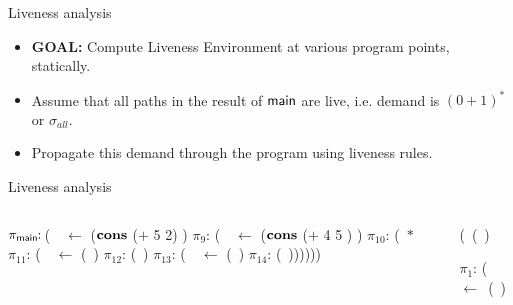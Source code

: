 \documentclass[xcolor=x11names,compress,mathserif]{beamer}
\renewcommand{\(}{\begin{columns}}
\renewcommand{\)}{\end{columns}}
\newcommand{\<}[1]{\begin{column}{#1}}
\renewcommand{\>}{\end{column}}
\begin{document}

\begin{frame}{Liveness analysis}
  \begin{itemize}
  \item {\bf  GOAL:} Compute  Liveness Environment at  various program
    points, statically. 
  \item Assume that all paths in the result of ${\sf main}$ are live, i.e. demand is $(0 + 1)^*$ or $\sigma_{all}$.
  \item Propagate this demand through the program using liveness rules.
  \end{itemize}
\end{frame}
\begin{frame}{Liveness analysis}
  \begin{columns}
    \begin{column}[T]{0.5\textwidth}
       \hspace*{-.3cm}\renewcommand{\arraystretch}{1}{
         \begin{uprogram}
           \hspace*{-.4cm} $\pi_{\sf main}\!\!:\, $(\LET\  \px\  $\leftarrow$ ($\mbox{$\mathbf{cons}$}$ ($+$ 5 2) \NIL)  \IN
              \hspace*{-.3cm}   $\pi_9\!\!:\, $(\LET\ \pz\ $\leftarrow$ ($\mbox{$\mathbf{cons}$}$ ($+$ 4 5 ) \px) \IN
              \hspace*{-.3cm}   $\pi_{10}\!\!:\, $(\SIF\ $*$
              \hspace*{-.35cm} $\pi_{11}\!\!:\, $(\LET\ \pw\  $\leftarrow$  (\plength\ \pz) \IN
              \hspace*{-.38cm}  $\pi_{12}\!\!:\, $(\RETURN\ \pw)
              \hspace*{-.35cm}  $\pi_{13}\!\!:\, $(\LET\ \pb\  $\leftarrow$ (\pfun\  \pz) \IN
              \hspace*{-.38cm} $\pi_{14}\!\!:\,$(\RETURN\ \pb))))))
       \end{uprogram}}
    \end{column}
    \begin{column}[T]{0.6\textwidth}
      \hspace*{-.8cm}  \renewcommand{\arraystretch}{1}{
        \begin{uprogram}
           (\DEFINE\ (\plength~\lista)
          
            $\pi_1\!\!:\, $(\LET\ \xtest\ $\leftarrow $\ (\NULLQ~\lista) \IN
          


\end{uprogram}}
\end{column}
\end{columns}
\end{frame}
\end{document}
